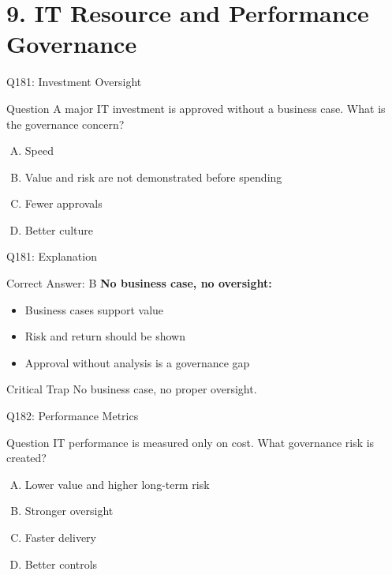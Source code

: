 \documentclass{beamer}
\begin{document}
	\section{9. IT Resource and Performance Governance}
	
	\begin{frame}{Q181: Investment Oversight}
		\begin{block}{Question}
			A major IT investment is approved without a business case. What is the governance concern?
		\end{block}
		\begin{enumerate}[(A)]
			\item Speed
			\item Value and risk are not demonstrated before spending
			\item Fewer approvals
			\item Better culture
		\end{enumerate}
	\end{frame}
	
	\begin{frame}{Q181: Explanation}
		\begin{block}{Correct Answer: B}
			\textbf{No business case, no oversight:}
			\begin{itemize}
				\item Business cases support value
				\item Risk and return should be shown
				\item Approval without analysis is a governance gap
			\end{itemize}
		\end{block}
		\begin{alertblock}{Critical Trap}
			No business case, no proper oversight.
		\end{alertblock}
	\end{frame}
	
	\begin{frame}{Q182: Performance Metrics}
		\begin{block}{Question}
			IT performance is measured only on cost. What governance risk is created?
		\end{block}
		\begin{enumerate}[(A)]
			\item Lower value and higher long-term risk
			\item Stronger oversight
			\item Faster delivery
			\item Better controls
		\end{enumerate}
	\end{frame}
	
\end{document}
